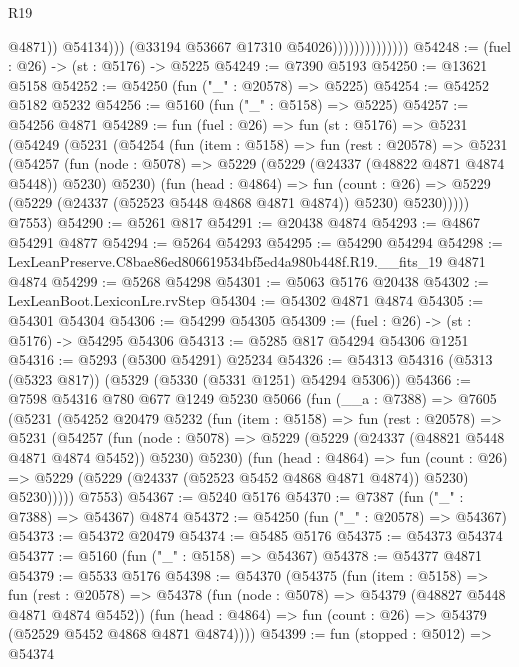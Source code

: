 \begin{lexlean}{R19}
\begin{coremodule}
                                        @4871))
                                    @54134)))
                              (@33194 @53667 @17310 @54026))))))))))))))
@54248 := (fuel : @26) -> (st : @5176) -> @5225
@54249 := @7390 @5193
@54250 := @13621 @5158
@54252 := @54250 (fun ("_" : @20578) => @5225)
@54254 := @54252 @5182 @5232
@54256 := @5160 (fun ("_" : @5158) => @5225)
@54257 := @54256 @4871
@54289 := fun (fuel : @26) =>
  fun (st : @5176) =>
  @5231
    (@54249
      (@5231
        (@54254
          (fun (item : @5158) =>
          fun (rest : @20578) =>
          @5231
            (@54257
              (fun (node : @5078) => @5229 (@5229 (@24337 (@48822 @4871 @4874 @5448)) @5230) @5230)
              (fun (head : @4864) =>
              fun (count : @26) =>
              @5229 (@5229 (@24337 (@52523 @5448 @4868 @4871 @4874)) @5230) @5230)))))
      @7553)
@54290 := @5261 @817
@54291 := @20438 @4874
@54293 := @4867 @54291 @4877
@54294 := @5264 @54293
@54295 := @54290 @54294
@54298 := LexLeanPreserve.C8bae86ed806619534bf5ed4a980b448f.R19.__fits_19 @4871 @4874
@54299 := @5268 @54298
@54301 := @5063 @5176 @20438
@54302 := LexLeanBoot.LexiconLre.rvStep
@54304 := @54302 @4871 @4874
@54305 := @54301 @54304
@54306 := @54299 @54305
@54309 := (fuel : @26) -> (st : @5176) -> @54295 @54306
@54313 := @5285 @817 @54294 @54306 @1251
@54316 := @5293 (@5300 @54291) @25234
@54326 := @54313 @54316 (@5313 (@5323 @817)) (@5329 (@5330 (@5331 @1251) @54294 @5306))
@54366 := @7598
    @54316
    @780
    @677
    @1249
    @5230
    @5066
    (fun (__a : @7388) =>
    @7605
      (@5231
        (@54252
          @20479
          @5232
          (fun (item : @5158) =>
          fun (rest : @20578) =>
          @5231
            (@54257
              (fun (node : @5078) =>
              @5229 (@5229 (@24337 (@48821 @5448 @4871 @4874 @5452)) @5230) @5230)
              (fun (head : @4864) =>
              fun (count : @26) =>
              @5229 (@5229 (@24337 (@52523 @5452 @4868 @4871 @4874)) @5230) @5230)))))
      @7553)
@54367 := @5240 @5176
@54370 := @7387 (fun ("_" : @7388) => @54367) @4874
@54372 := @54250 (fun ("_" : @20578) => @54367)
@54373 := @54372 @20479
@54374 := @5485 @5176
@54375 := @54373 @54374
@54377 := @5160 (fun ("_" : @5158) => @54367)
@54378 := @54377 @4871
@54379 := @5533 @5176
@54398 := @54370
    (@54375
      (fun (item : @5158) =>
      fun (rest : @20578) =>
      @54378
        (fun (node : @5078) => @54379 (@48827 @5448 @4871 @4874 @5452))
        (fun (head : @4864) => fun (count : @26) => @54379 (@52529 @5452 @4868 @4871 @4874))))
@54399 := fun (stopped : @5012) => @54374

\end{coremodule}
\end{lexlean}
